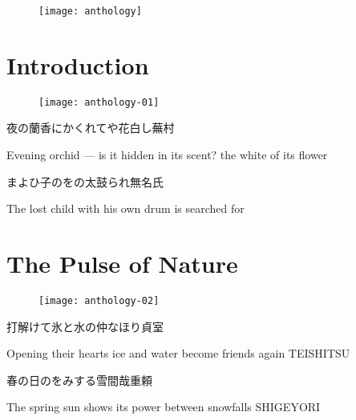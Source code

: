 
\begin{figure}
    \thispagestyle{empty}
    \centering
    \texttt{[image: anthology]}
\end{figure}

\chapter{Introduction}

\begin{figure}
    \texttt{[image: anthology-01]}
\end{figure}

\setcounter{haikucounter}{0}

\begin{haiku}
    {\FH 夜の蘭香にかくれてや花白し}\hfill{\FH 蕪村}

    \vin{} Evening orchid ---
    \vin{} \vin{} is it hidden in its scent?
    \vin{} \vin{} \vin{} the white of its flower

\end{haiku}

\begin{haiku}
    {\FH まよひ子のをの太鼓られ}\hfill{\FH 無名氏}

    \vin{} The lost child
    \vin{} \vin{} with his own drum
    \vin{} \vin{} \vin{} is searched for
\end{haiku}

\chapter{The Pulse of Nature}

\begin{figure}
    \texttt{[image: anthology-02]}
\end{figure}

\begin{haiku}
    {\FH 打解けて氷と水の仲なほり}\hfill{\FH 貞室}

    \vin{} Opening their hearts
    \vin{} \vin{} ice and water become
    \vin{} \vin{} \vin{} friends again
    \hspace*{\fill} TEISHITSU
\end{haiku}

\begin{haiku}
    {\FH 春の日のをみする雪間哉}\hfill{\FH 重頼}

    \vin{} The spring sun
    \vin{} \vin{} shows its power
    \vin{} \vin{} \vin{} between snowfalls \hspace{\fill} SHIGEYORI
\end{haiku}

